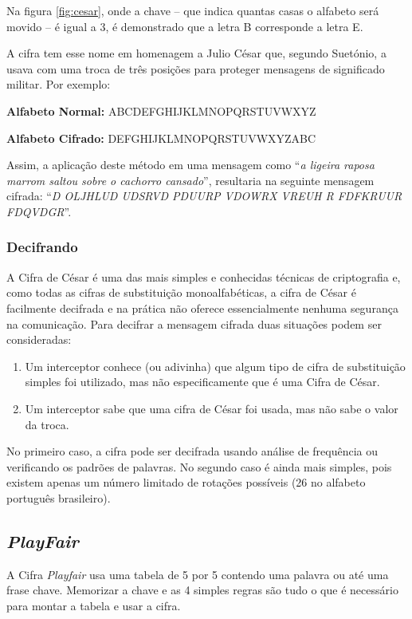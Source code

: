 \documentclass[
article,			%
11pt,				%
oneside,			%
a4paper,			%
english,			%
brazil,				%
sumario=tradicional
]{abntex2}
\begin{document}
				Na figura \ref{fig:cesar}, onde a chave – que indica quantas casas o alfabeto será movido – é igual a 3,  é demonstrado que a letra B corresponde a letra E.
				
				A cifra tem esse nome em homenagem a Julio César que, segundo Suetónio, a usava com uma troca de três posições para proteger mensagens de significado militar. Por exemplo:
				
				\textbf{Alfabeto Normal:}  ABCDEFGHIJKLMNOPQRSTUVWXYZ
				
				\textbf{Alfabeto Cifrado:}  DEFGHIJKLMNOPQRSTUVWXYZABC
				
				Assim, a aplicação deste método em uma mensagem como ``\textit{a ligeira raposa marrom saltou sobre o cachorro cansado}'', resultaria na seguinte mensagem cifrada: ``\textit{D OLJHLUD UDSRVD PDUURP VDOWRX VREUH R FDFKRUUR FDQVDGR}''.
				
				\subsubsection*{Decifrando}
					A Cifra de César é uma das mais simples e conhecidas técnicas de criptografia e, como todas as cifras de substituição monoalfabéticas, a cifra de César é facilmente decifrada e na prática não oferece essencialmente nenhuma segurança na comunicação. Para decifrar a mensagem cifrada duas situações podem ser consideradas:
					\begin{enumerate}
						\item Um interceptor conhece (ou adivinha) que algum tipo de cifra de substituição simples foi utilizado, mas não especificamente que é uma Cifra de César.
						\item Um interceptor sabe que uma cifra de César foi usada, mas não sabe o valor da troca.
					\end{enumerate}
	
					No primeiro caso, a cifra pode ser decifrada usando análise de frequência ou verificando os padrões de palavras. No segundo caso é ainda mais simples, pois existem apenas um número limitado de rotações possíveis (26 no alfabeto português brasileiro).
		
		\subsection{\textit{PlayFair}}
			A Cifra \textit{Playfair} usa uma tabela de 5 por 5 contendo uma palavra ou até uma frase chave. Memorizar a chave e as 4 simples regras são tudo o que é necessário para montar a tabela e usar a cifra.
			
\end{document}
